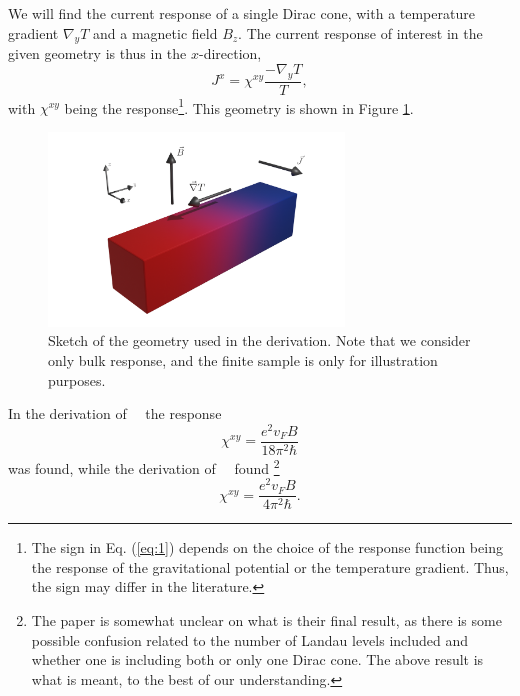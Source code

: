 We will find the current response of a single Dirac cone, with a temperature gradient $\nabla_y T$ and a magnetic field $B_z$.
The current response of interest in the given geometry is thus in the $x$-direction,
\begin{equation}\label{eq:1}
  J^x = \chi ^{xy} \frac{- \nabla _yT}{T},
\end{equation}
with $\chi^{xy}$  being the response\footnote{The sign in Eq. (\ref{eq:1}) depends on the choice of the response function being the response of the gravitational potential or the temperature gradient. Thus, the sign may differ in the literature.}.
This geometry is shown in Figure \ref{fig:setup}.
\begin{figure}[ht]
  \centering
  \includegraphics[width=0.7\textwidth]{figures/setup.png}
  \caption{Sketch of the geometry used in the derivation. Note that we consider only bulk response, and the finite sample is only for illustration purposes. \label{fig:setup}}
\end{figure}
In the derivation of~\citeauthor{chernodubGenerationNernstCurrent2018}~\cite{chernodubGenerationNernstCurrent2018} the response
\begin{equation}
  \chi ^{xy} = \frac{e^2 v_F B}{18 \pi ^2 \hbar }
\end{equation}
was found, while the derivation of~\citeauthor{arjonaFingerprintsConformalAnomaly2019}~\cite{arjonaFingerprintsConformalAnomaly2019} found
\footnote{The paper is somewhat unclear on what is their final result, as there is some possible confusion related to the number of Landau levels included and whether one is including both or only one Dirac cone.
The above result is what is meant, to the best of our understanding.}
\begin{equation}
  \chi ^{xy} = \frac{e^2 v_F B}{4 \pi ^2 \hbar }.
\end{equation}

